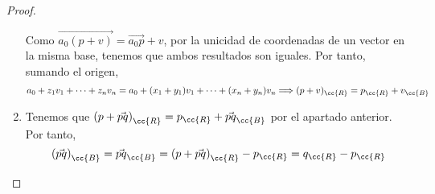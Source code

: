 \begin{proof}
\begin{enumerate}
        Como $\vec{a_0(p+v)}=\vec{a_0p}+v$, por la unicidad de coordenadas de un vector en la misma base, tenemos que ambos resultados son iguales. Por tanto, sumando el origen,
        \begin{equation*}
            a_0+z_1v_1+\dots+z_nv_n = a_0+(x_1+y_1)v_1 + \dots + (x_n+y_n)v_n \Longrightarrow (p+v)_\cc{R}=p_{\cc{R}} + v_{\cc{B}}
        \end{equation*}

        \item Tenemos que $\left(p+\vec{pq}\right)_{\cc{R}} = p_{\cc{R}} + \vec{pq}_{\cc{B}}$ por el apartado anterior. Por tanto,
        \begin{equation*}
            \left(\vec{pq}\right)_{\cc{B}} = \vec{pq}_{\cc{B}} = \left(p+\vec{pq}\right)_{\cc{R}} - p_{\cc{R}} = q_{\cc{R}}-p_{\cc{R}}
        \end{equation*}
        
        \begin{comment}
        Por definición de coordenadas en un sistema de referencia, se tiene que:
        \begin{gather*}
            p_{\cc{R}}=(x_1,\dots,x_n)\Longleftrightarrow p=a_0+x_1v_1+\dots + x_nv_n\\
            q_{\cc{R}}=(y_1,\dots,y_n)\Longleftrightarrow q=a_0+y_1v_1+\dots + y_nv_n
        \end{gather*}

        Por definición de las coordenadas en un espacio vectorial, tenemos que:
        \begin{equation*}
            \left(\vec{pq}\right)_{\cc{B}}=(z_1,\dots,z_n)\Longleftrightarrow \vec{pq}=z_1v_1+\dots+z_nv_n
        \end{equation*}

        Por la igualdad triangular, tenemos que:
        \begin{equation*}
            q-p=\vec{pq} = \vec{pa_0} + \vec{a_0q}
        \end{equation*}
        
        Entonces:
        \begin{equation*}\begin{split}
            \vec{pq}&=z_1v_1+\dots+z_nv_n \\
            \vec{pa_0} + \vec{a_0q} &= \vec{(a_0+x_1v_1+\dots + x_nv_n)a_0} + \vec{a_0(a_0+y_1v_1+\dots + y_nv_n)} =\\&\qquad=
            -(x_1v_1+\dots + x_nv_n) + (y_1v_1+\dots + y_nv_n)
            =\\&\qquad= (y_1-x_1)v_1 + \dots + (y_n-x_n)v_n
        \end{split}\end{equation*}


\end{comment}
\end{enumerate}
\end{proof}
